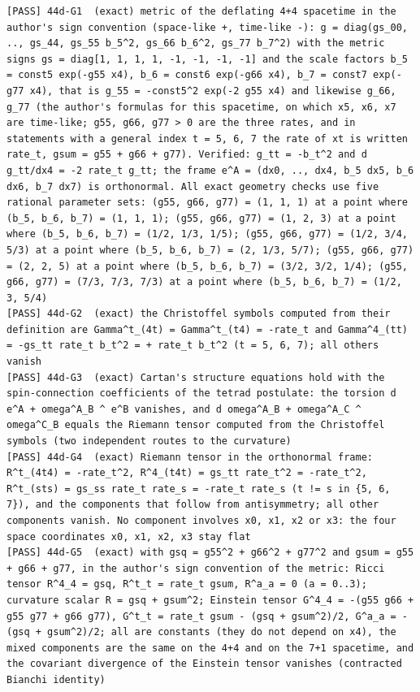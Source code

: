 \documentclass[
  10pt,
]{article}
\begin{document}
\begin{verbatim}
[PASS] 44d-G1  (exact) metric of the deflating 4+4 spacetime in the author's sign convention (space-like +, time-like -): g = diag(gs_00, .., gs_44, gs_55 b_5^2, gs_66 b_6^2, gs_77 b_7^2) with the metric signs gs = diag[1, 1, 1, 1, -1, -1, -1, -1] and the scale factors b_5 = const5 exp(-g55 x4), b_6 = const6 exp(-g66 x4), b_7 = const7 exp(-g77 x4), that is g_55 = -const5^2 exp(-2 g55 x4) and likewise g_66, g_77 (the author's formulas for this spacetime, on which x5, x6, x7 are time-like; g55, g66, g77 > 0 are the three rates, and in statements with a general index t = 5, 6, 7 the rate of xt is written rate_t, gsum = g55 + g66 + g77). Verified: g_tt = -b_t^2 and d g_tt/dx4 = -2 rate_t g_tt; the frame e^A = (dx0, .., dx4, b_5 dx5, b_6 dx6, b_7 dx7) is orthonormal. All exact geometry checks use five rational parameter sets: (g55, g66, g77) = (1, 1, 1) at a point where (b_5, b_6, b_7) = (1, 1, 1); (g55, g66, g77) = (1, 2, 3) at a point where (b_5, b_6, b_7) = (1/2, 1/3, 1/5); (g55, g66, g77) = (1/2, 3/4, 5/3) at a point where (b_5, b_6, b_7) = (2, 1/3, 5/7); (g55, g66, g77) = (2, 2, 5) at a point where (b_5, b_6, b_7) = (3/2, 3/2, 1/4); (g55, g66, g77) = (7/3, 7/3, 7/3) at a point where (b_5, b_6, b_7) = (1/2, 3, 5/4)
[PASS] 44d-G2  (exact) the Christoffel symbols computed from their definition are Gamma^t_(4t) = Gamma^t_(t4) = -rate_t and Gamma^4_(tt) = -gs_tt rate_t b_t^2 = + rate_t b_t^2 (t = 5, 6, 7); all others vanish
[PASS] 44d-G3  (exact) Cartan's structure equations hold with the spin-connection coefficients of the tetrad postulate: the torsion d e^A + omega^A_B ^ e^B vanishes, and d omega^A_B + omega^A_C ^ omega^C_B equals the Riemann tensor computed from the Christoffel symbols (two independent routes to the curvature)
[PASS] 44d-G4  (exact) Riemann tensor in the orthonormal frame: R^t_(4t4) = -rate_t^2, R^4_(t4t) = gs_tt rate_t^2 = -rate_t^2, R^t_(sts) = gs_ss rate_t rate_s = -rate_t rate_s (t != s in {5, 6, 7}), and the components that follow from antisymmetry; all other components vanish. No component involves x0, x1, x2 or x3: the four space coordinates x0, x1, x2, x3 stay flat
[PASS] 44d-G5  (exact) with gsq = g55^2 + g66^2 + g77^2 and gsum = g55 + g66 + g77, in the author's sign convention of the metric: Ricci tensor R^4_4 = gsq, R^t_t = rate_t gsum, R^a_a = 0 (a = 0..3); curvature scalar R = gsq + gsum^2; Einstein tensor G^4_4 = -(g55 g66 + g55 g77 + g66 g77), G^t_t = rate_t gsum - (gsq + gsum^2)/2, G^a_a = -(gsq + gsum^2)/2; all are constants (they do not depend on x4), the mixed components are the same on the 4+4 and on the 7+1 spacetime, and the covariant divergence of the Einstein tensor vanishes (contracted Bianchi identity)

\end{verbatim}
\end{document}
